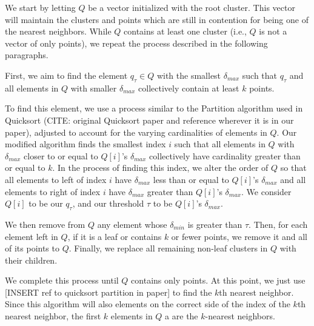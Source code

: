 We start by letting $Q$ be a vector initialized with the root cluster. This vector will maintain the 
clusters and points which are still in contention for being one of the nearest neighbors.
While $Q$ contains at least one cluster (i.e., $Q$ is not a vector of only points), we repeat the process described in 
the following paragraphs. 

First, 
we aim to find the element $q_{\tau} \in Q$ with the smallest $\delta_{max}$ such that 
$q_{\tau}$ and all elements in $Q$ with smaller $\delta_{max}$ collectively contain at least $k$ points. 

To find this element, 
we use a process similar to the Partition algorithm used in Quicksort (CITE: original Quicksort paper and reference wherever it is 
in our paper), adjusted to account for the varying cardinalities of elements in $Q$. Our modified algorithm finds the smallest index $i$ such 
that all elements in $Q$ with $\delta_{max}$ closer to or equal to $Q[i]$'s $\delta_{max}$ collectively have cardinality greater
than or equal to $k$. In the process of finding this index, we alter the order of $Q$ so that all elements to left
of index $i$ have $\delta_{max}$ less than or equal to $Q[i]$'s $\delta_{max}$ and all elements to right of index $i$
have $\delta_{max}$ greater than $Q[i]$'s $\delta_{max}$. We consider $Q[i]$ to be our $q_{\tau}$, and our threshold 
$\tau$ to be $Q[i]$'s $\delta_{max}$.

We then remove from $Q$ any element whose $\delta_{min}$ is greater than $\tau$. Then, for each element left 
in $Q$, if it is a leaf or contains $k$ or fewer points, we remove it and all of its points to $Q$. Finally, we
replace all remaining non-leaf clusters in $Q$ with their children. 

We complete this process until $Q$ contains only points. At this point, we 
just use [INSERT ref to quicksort partition in paper] to find the $k$th 
nearest neighbor. Since this algorithm will also elements on the correct side of 
the index of the $k$th nearest neighbor, the first $k$ elements in $Q$ a are the $k$-nearest neighbors.



